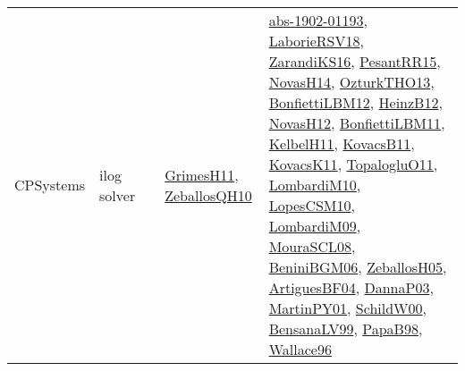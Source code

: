 {\begin{longtable}{llp{6cm}p{6cm}p{6cm}}
CPSystems & ilog solver &  & \href{papers/GrimesH11.pdf}{GrimesH11}\cite{GrimesH11}, \href{articles/ZeballosQH10.pdf}{ZeballosQH10}\cite{ZeballosQH10} & \href{articles/abs-1902-01193.pdf}{abs-1902-01193}\cite{abs-1902-01193}, \href{articles/LaborieRSV18.pdf}{LaborieRSV18}\cite{LaborieRSV18}, \href{articles/ZarandiKS16.pdf}{ZarandiKS16}\cite{ZarandiKS16}, \href{papers/PesantRR15.pdf}{PesantRR15}\cite{PesantRR15}, \href{articles/NovasH14.pdf}{NovasH14}\cite{NovasH14}, \href{articles/OzturkTHO13.pdf}{OzturkTHO13}\cite{OzturkTHO13}, \href{papers/BonfiettiLBM12.pdf}{BonfiettiLBM12}\cite{BonfiettiLBM12}, \href{papers/HeinzB12.pdf}{HeinzB12}\cite{HeinzB12}, \href{articles/NovasH12.pdf}{NovasH12}\cite{NovasH12}, \href{papers/BonfiettiLBM11.pdf}{BonfiettiLBM11}\cite{BonfiettiLBM11}, \href{articles/KelbelH11.pdf}{KelbelH11}\cite{KelbelH11}, \href{articles/KovacsB11.pdf}{KovacsB11}\cite{KovacsB11}, \href{articles/KovacsK11.pdf}{KovacsK11}\cite{KovacsK11}, \href{articles/TopalogluO11.pdf}{TopalogluO11}\cite{TopalogluO11}, \href{papers/LombardiM10.pdf}{LombardiM10}\cite{LombardiM10}, \href{articles/LopesCSM10.pdf}{LopesCSM10}\cite{LopesCSM10}, \href{papers/LombardiM09.pdf}{LombardiM09}\cite{LombardiM09}, \href{papers/MouraSCL08.pdf}{MouraSCL08}\cite{MouraSCL08}, \href{papers/BeniniBGM06.pdf}{BeniniBGM06}\cite{BeniniBGM06}, \href{articles/ZeballosH05.pdf}{ZeballosH05}\cite{ZeballosH05}, \href{papers/ArtiguesBF04.pdf}{ArtiguesBF04}\cite{ArtiguesBF04}, \href{papers/DannaP03.pdf}{DannaP03}\cite{DannaP03}, \href{articles/MartinPY01.pdf}{MartinPY01}\cite{MartinPY01}, \href{articles/SchildW00.pdf}{SchildW00}\cite{SchildW00}, \href{articles/BensanaLV99.pdf}{BensanaLV99}\cite{BensanaLV99}, \href{articles/PapaB98.pdf}{PapaB98}\cite{PapaB98}, \href{articles/Wallace96.pdf}{Wallace96}\cite{Wallace96}\\

\end{longtable}}
